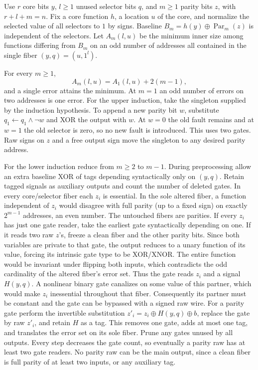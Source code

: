 \documentclass[11pt]{article}
\begin{document}
Use \(r\) core bits \(y\), \(l\ge1\) unused selector bits \(q\), and \(m\ge1\) parity bits \(z\), with \(r+l+m=n\). Fix a core function \(h\), a location \(u\) of the core, and normalize the selected value of all selectors to \(1\) by signs. Baseline \(B_m=h(y)\oplus\operatorname{Par}_m(z)\) is independent of the selectors. Let \(A_m(l,u)\) be the minimum inner size among functions differing from \(B_m\) on an odd number of addresses all contained in the single fiber \((y,q)=(u,1^l)\).

For every \(m\ge1\),
\[
 A_m(l,u)=A_1(l,u)+2(m-1),
\]
and a single error attains the minimum. At \(m=1\) an odd number of errors on two addresses is one error. For the upper induction, take the singleton supplied by the induction hypothesis. To append a new parity bit \(w\), substitute \(q_1\gets q_1\wedge\neg w\) and XOR the output with \(w\). At \(w=0\) the old fault remains and at \(w=1\) the old selector is zero, so no new fault is introduced. This uses two gates. Raw signs on \(z\) and a free output sign move the singleton to any desired parity address.

For the lower induction reduce from \(m\ge2\) to \(m-1\). During preprocessing allow an extra baseline XOR of tags depending syntactically only on \((y,q)\). Retain tagged signals as auxiliary outputs and count the number of deleted gates. In every core/selector fiber each \(z_i\) is essential. In the sole altered fiber, a function independent of \(z_i\) would disagree with full parity (up to a fixed sign) on exactly \(2^{m-1}\) addresses, an even number. The untouched fibers are parities. If every \(z_i\) has just one gate reader, take the earliest gate syntactically depending on one. If it reads two raw \(z\)'s, freeze a clean fiber and the other parity bits. Since both variables are private to that gate, the output reduces to a unary function of its value, forcing its intrinsic gate type to be XOR/XNOR. The entire function would be invariant under flipping both inputs, which contradicts the odd cardinality of the altered fiber's error set. Thus the gate reads \(z_i\) and a signal \(H(y,q)\). A nonlinear binary gate canalizes on some value of this partner, which would make \(z_i\) inessential throughout that fiber. Consequently its partner must be constant and the gate can be bypassed with a signed raw wire. For a parity gate perform the invertible substitution \(z'_i=z_i\oplus H(y,q)\oplus b\), replace the gate by raw \(z'_i\), and retain \(H\) as a tag. This removes one gate, adds at most one tag, and translates the error set on its sole fiber. Prune any gates unused by all outputs. Every step decreases the gate count, so eventually a parity raw has at least two gate readers. No parity raw can be the main output, since a clean fiber is full parity of at least two inputs, or any auxiliary tag.
\end{document}
